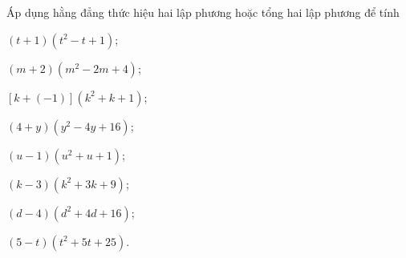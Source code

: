 \begin{vn}
Áp dụng hằng đẳng thức hiệu hai lập phương hoặc tổng hai lập phương để tính 
	\begin{listEX}[2]
		\item $(t+1)(t^2 - t + 1)$;
		\item $(m+2)(m^2 - 2m + 4)$;
		\item $[k+(-1)](k^2 + k + 1)$;
		\item $(4+y)(y^2 -4y + 16)$;
		\item $(u-1)(u^2 + u + 1)$;
		\item $(k-3)(k^2 + 3k + 9)$;
		\item $(d-4)(d^2 + 4d + 16)$;
		\item $(5-t)(t^2 + 5t + 25)$.
	\end{listEX}
\end{vn}
